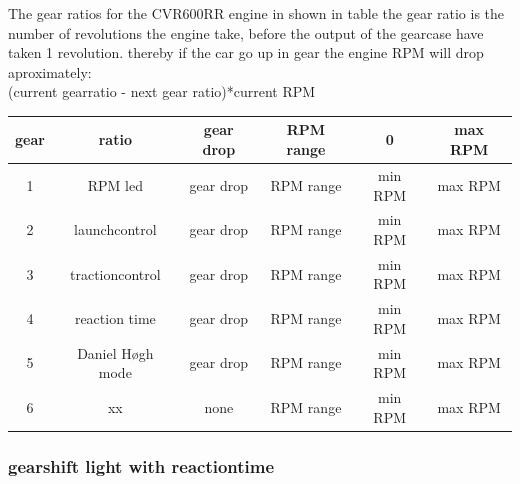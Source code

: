 The gear ratios for the CVR600RR engine in shown in table %
the gear ratio is the number of revolutions the engine take, before the output of the gearcase have taken 1 revolution.
thereby if the car go up in gear the engine RPM will drop aproximately: \\ (current gearratio - next gear ratio)*current RPM  

\begin{center}
\footnotesize
  \begin{tabular}{| c | c | c | c | c | c |}
    \hline
    gear  & ratio  & gear drop & RPM range & 0 & max RPM \\ \hline
    1     & RPM led & gear drop & RPM range & min RPM & max RPM            \\ \hline
    2 & launchcontrol & gear drop & RPM range & min RPM & max RPM       \\ \hline
    3 & tractioncontrol & gear drop & RPM range & min RPM & max RPM    \\ \hline
    4 & reaction time & gear drop & RPM range & min RPM & max RPM      \\ \hline
    5 & Daniel Høgh mode & gear drop & RPM range & min RPM & max RPM   \\ \hline
    6 & xx & none & RPM range & min RPM & max RPM                 \\ \hline
  \end{tabular}
\label{tab:gear_ratio}
\end{center}


\subsubsection*{gearshift light with reactiontime} 
